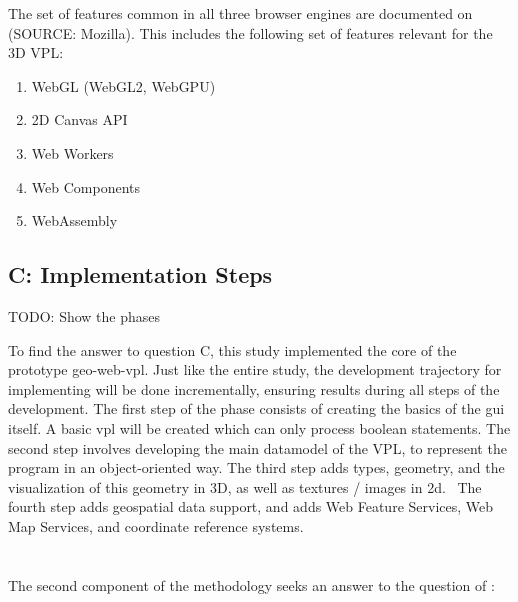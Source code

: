 The set of features common in all three browser engines are documented on (SOURCE: Mozilla). 
This includes the following set of features relevant for the 3D VPL:
\begin{enumerate}[-]
  \item WebGL (WebGL2, WebGPU)
  \item 2D Canvas API
  \item Web Workers
  \item Web Components
  \item WebAssembly
\end{enumerate}

\subsection*{C: Implementation Steps}

\begin{note}
TODO: Show the phases
\end{note}

To find the answer to question C, this study implemented the core of the prototype \ac{geo-web-vpl}.
Just like the entire study, the development trajectory for implementing will be done incrementally, ensuring results during all steps of the development. 
The first step of the phase consists of creating the basics of the \ac{gui} itself. 
A basic \ac{vpl} will be created which can only process boolean statements. 
The second step involves developing the main datamodel of the VPL, to represent the program in an object-oriented way. 
The third step adds types, geometry, and the visualization of this geometry in 3D, as well as textures / images in 2d. \
The fourth step adds geospatial data support, and adds Web Feature Services, Web Map Services, and coordinate reference systems.  


\section{\mySubRQTwoTitle} 
\label{sec:method-two}
The second component of the methodology seeks an answer to the question of \mySubRQTwoTitle: \mySubRQTwo


